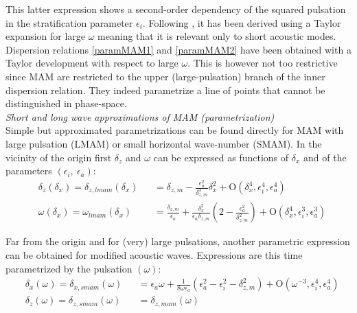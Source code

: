 \documentclass[a4paper,11pt]{article}
\begin{document}
This latter expression shows a second-order dependency of the squared pulsation in the stratification parameter $\epsilon_i$. Following \cite{smith_2015}, it has been derived using a Taylor expansion for large $\omega$ meaning that it is relevant only to short acoustic modes. Dispersion relations \ref{paramMAM1} and \ref{paramMAM2} have been obtained with a Taylor development with respect to large $\omega$. This is however not too restrictive since MAM are restricted to the upper (large-pulsation) branch of the inner dispersion relation. They indeed parametrize a line of points that cannot be distinguished in phase-space.\\

\textit{Short and long wave approximations of MAM (parametrization)}\\
Simple but approximated parametrizations can be found directly for MAM with large pulsation (LMAM) or small horizontal wave-number (SMAM). In the vicinity of the origin first $\delta_z$ and $\omega$ can be expressed as functions of $\delta_x$ and of the parameters $(\epsilon_i,\ \epsilon_a)$:
\begin{subequations}
	\label{ParamAcousModes1}
	\begin{alignat}{2}	
		\label{ParamLMAM1}
		&\delta_{z}(\delta_x)=\delta_{z,lmam}(\delta_x) &&= \delta_{z,m} 
		-\frac{\epsilon_a^2}{\delta_{z,m}^3}\delta_x^2
	+\mathrm{O}	(\delta_x^4,\epsilon_i^4,\epsilon_a^4)\\[3mm]
		\label{ParamLMAM2}
	    &\omega(\delta_x)=\omega_{lmam}(\delta_x) &&= \frac{\delta_{z,m}}{\epsilon_a}
	    +\frac{\delta_x^2}{\epsilon_a\delta_{z,m}} 
	    \left(2
	    -\frac{\epsilon_a^2}{\delta_{z,m}^2} \right)
	    +\mathrm{O}	(\delta_x^4,\epsilon_i^3,\epsilon_a^3)
	\end{alignat}
\end{subequations}

Far from the origin and for (very) large pulsations, another parametric expression can be obtained for modified acoustic waves. Expressions are this time parametrized by the pulsation $(\omega)$:
\begin{subequations}
	   \label{ParamAcousModes2}
	\begin{alignat}{2}	
		\label{ParamSMAM1}
		&\delta_{x}(\omega)=\delta_{x,smam}(\omega) &&= \epsilon_a \omega
		+\frac{1}{8\omega\epsilon_a}\left( 
		\epsilon_a^2-\epsilon_i^2-\delta_{z,m}^2
		\right)
		+\mathrm{O}	(\omega^{-3},\epsilon_i^4,\epsilon_a^4)
		\\[3mm]
		\label{ParamSMAM2}
		&\delta_{z}(\omega)=\delta_{z,smam}(\omega) &&=\delta_{z,mam}(\omega)
	\end{alignat}
\end{subequations}
\end{document}
